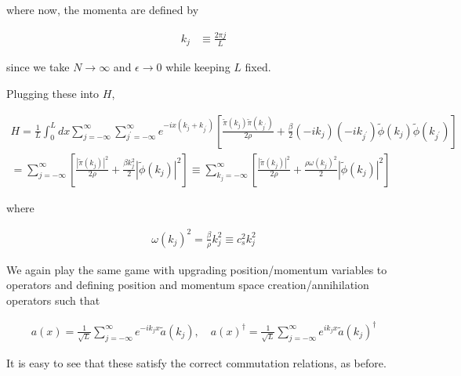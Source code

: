 \documentclass[pre,floatfix,onecolumn]{revtex4-2}
\begin{document}
where now, the momenta are defined by

\begin{align}
k_{j} &\equiv \frac{2 \pi j}{L}
\end{align}

since we take $N \rightarrow \infty$ and $\epsilon \rightarrow 0$ while keeping $L$ fixed.

Plugging these into $H$,

\begin{widetext}
    \begin{equation}
        \begin{gathered}
            H = \frac{1}{L} \int_{0}^{L} d x \sum_{j=-\infty}^{\infty} \sum_{j^{\prime}=-\infty}^{\infty} e^{-i x\left(k_{j}+k_{j^{\prime}}\right)}\left[\frac{\tilde{\pi}\left(k_{j}\right) \tilde{\pi}\left(k_{j^{\prime}}\right)}{2 \rho}+\frac{\beta}{2}\left(-i k_{j}\right)\left(-i k_{j^{\prime}}\right) \tilde{\phi}\left(k_{j}\right) \tilde{\phi}\left(k_{j^{\prime}}\right)\right] \\
= \sum_{j=-\infty}^{\infty}\left[\frac{\left|\tilde{\pi}\left(k_{j}\right)\right|^{2}}{2 \rho}+\frac{\beta k_{j}^{2}}{2}\left|\tilde{\phi}\left(k_{j}\right)\right|^{2}\right] \equiv \sum_{k_{j}=-\infty}^{\infty}\left[\frac{\left|\tilde{\pi}\left(k_{j}\right)\right|^{2}}{2 \rho}+\frac{\rho \omega\left(k_{j}\right)^{2}}{2}\left|\tilde{\phi}\left(k_{j}\right)\right|^{2}\right]
        \end{gathered}
    \end{equation}
\end{widetext}

where

\begin{align}
\omega\left(k_{j}\right)^{2} = \frac{\beta}{\rho} k_{j}^{2} \equiv c_{s}^{2} k_{j}^{2}
\end{align}

We again play the same game with upgrading position/momentum variables to operators and defining position and momentum space creation/annihilation operators such that

\begin{align}
a(x) = \frac{1}{\sqrt{L}} \sum_{j=-\infty}^{\infty} e^{-i k_{j} x} \tilde{a}\left(k_{j}\right), \quad
a(x)^{\dagger} = \frac{1}{\sqrt{L}} \sum_{j=-\infty}^{\infty} e^{i k_{j} x} \tilde{a}\left(k_{j}\right)^{\dagger}
\end{align}

It is easy to see that these satisfy the correct commutation relations, as before.
\end{document}
